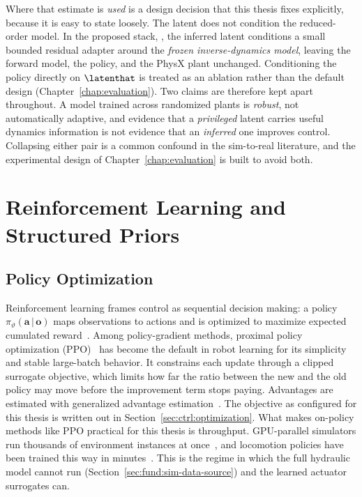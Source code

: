 Where that estimate is \emph{used} is a design decision that this thesis
fixes explicitly, because it is easy to state loosely. The latent does
not condition the reduced-order model. In the proposed stack,
\ppoIDAAMFD, the inferred latent conditions a small bounded residual
adapter around the \emph{frozen inverse-dynamics model}, leaving the
forward model, the policy, and the PhysX plant unchanged. Conditioning
the policy directly on $\latenthat$ is treated as an ablation rather
than the default design (Chapter~\ref{chap:evaluation}). Two claims are
therefore kept apart throughout. A model trained across randomized
plants is \emph{robust}, not automatically adaptive, and evidence that a
\emph{privileged} latent carries useful dynamics information is not
evidence that an \emph{inferred} one improves control. Collapsing either
pair is a common confound in the sim-to-real literature, and the
experimental design of Chapter~\ref{chap:evaluation} is built to avoid
both.

\section{Reinforcement Learning and Structured Priors}
\label{sec:fund:rl-residual}

\subsection{Policy Optimization}

Reinforcement learning frames control as sequential decision making: a
policy $\pi_\vartheta(\bm{a}\,|\,\bm{o})$ maps observations to actions
and is optimized to maximize expected cumulated
reward~\cite{sutton2018reinforcement}. Among policy-gradient methods,
proximal policy optimization (PPO)~\cite{schulman2017proximal} has
become the default in robot learning for its simplicity and stable
large-batch behavior. It constrains each update through a clipped surrogate objective, which
limits how far the ratio between the new and the old policy may move before
the improvement term stops paying. Advantages are estimated with generalized
advantage estimation~\cite{schulman2016gae}. The objective as configured for
this thesis is written out in Section~\ref{sec:ctrl:optimization}. What makes
on-policy methods like PPO practical for this thesis is throughput.
GPU-parallel simulators run thousands of environment instances at
once~\cite{makoviychuk2021isaac}, and locomotion policies have been
trained this way in minutes~\cite{rudin2022learning}. This is the regime
in which the full hydraulic model cannot run
(Section~\ref{sec:fund:sim-data-source}) and the learned actuator
surrogates can.

